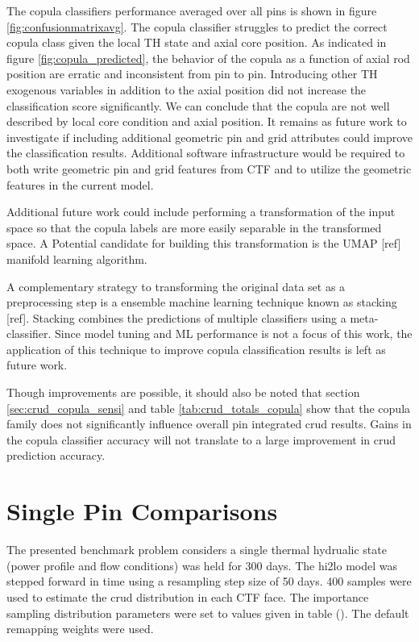 The copula classifiers performance averaged over all pins is shown in figure \ref{fig:confusionmatrixavg}. The copula classifier struggles to predict the correct copula class given the local TH state and axial core position.  As indicated in figure \ref{fig:copula_predicted}, the behavior of the copula as a function of axial rod position are erratic and inconsistent from pin to pin.  Introducing other TH exogenous variables in addition to the axial position did not increase the classification score significantly.  We can conclude that the copula are not well described by local core condition and axial position.  It remains as future work to investigate if including additional geometric pin and grid attributes could improve the classification results.  Additional software infrastructure would be required to both write geometric pin and grid features from CTF and to utilize the geometric features in the current model.

Additional future work could include performing a transformation of the input space so that the copula labels are more easily separable in the transformed space.  A Potential candidate for building this transformation is the UMAP [ref] manifold learning algorithm.

A complementary strategy to transforming the original data set as a preprocessing step is a ensemble machine learning technique known as stacking [ref].  Stacking combines the predictions of multiple classifiers using a meta-classifier.  Since model tuning and ML performance is not a focus of this work, the application of this technique to improve copula classification results is left as future work.

Though improvements are possible, it should also be noted that section \ref{sec:crud_copula_sensi} and table \ref{tab:crud_totals_copula} show that the copula family does not significantly influence overall pin integrated crud results.  Gains in the copula classifier accuracy will not translate to a large improvement in crud prediction accuracy.

\section{Single Pin Comparisons}
\label{sec:single_pin_result}

The presented benchmark problem considers a single thermal hydrualic state (power profile and flow conditions) was held for 300 days.  The hi2lo model was stepped forward in time using a resampling step size of 50 days.  400 samples were used to estimate the crud distribution in each CTF face.  The importance sampling distribution parameters were set to values given in table ().  The default remapping
weights were used.

